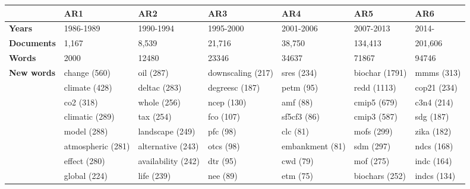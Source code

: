 \begin{tabular}{l p{1.8cm} p{1.8cm} p{1.8cm} p{1.8cm} p{1.8cm} p{1.8cm}} 
&\textbf{AR1} & \textbf{AR2} & \textbf{AR3} & \textbf{AR4} & \textbf{AR5} & \textbf{AR6}\\ \hline\textbf{Years} &1986-1989 & 1990-1994 & 1995-2000 & 2001-2006 & 2007-2013 & 2014-\\ 
\textbf{Documents} &1,167 & 8,539 & 21,716 & 38,750 & 134,413 & 201,606\\ 
\textbf{Words} &2000 & 12480 & 23346 & 34637 & 71867 & 94746\\ 
\textbf{New words} & change (560) & oil (287) & downscaling (217) & sres (234) & biochar (1791) & mmms (313)\\ & climate (428) & deltac (283) & degreesc (187) & petm (95) & redd (1113) & cop21 (234)\\ & co2 (318) & whole (256) & ncep (130) & amf (88) & cmip5 (679) & c3n4 (214)\\ & climatic (289) & tax (254) & fco (107) & sf5cf3 (86) & cmip3 (587) & sdg (187)\\ & model (288) & landscape (249) & pfc (98) & clc (81) & mofs (299) & zika (182)\\ & atmospheric (281) & alternative (243) & otcs (98) & embankment (81) & sdm (297) & ndcs (168)\\ & effect (280) & availability (242) & dtr (95) & cwd (79) & mof (275) & indc (164)\\ & global (224) & life (239) & nee (89) & etm (75) & biochars (252) & indcs (134)
\end{tabular}
